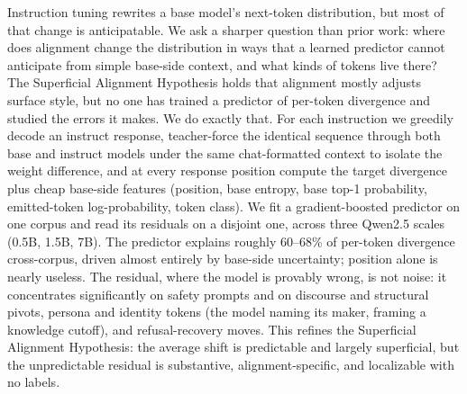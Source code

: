 Instruction tuning rewrites a base model's next-token distribution, but most of that change is anticipatable. We ask a sharper question than prior work: where does alignment change the distribution in ways that a learned predictor cannot anticipate from simple base-side context, and what kinds of tokens live there? The Superficial Alignment Hypothesis holds that alignment mostly adjusts surface style, but no one has trained a predictor of per-token divergence and studied the errors it makes. We do exactly that. For each instruction we greedily decode an instruct response, teacher-force the identical sequence through both base and instruct models under the same chat-formatted context to isolate the weight difference, and at every response position compute the target divergence plus cheap base-side features (position, base entropy, base top-1 probability, emitted-token log-probability, token class). We fit a gradient-boosted predictor on one corpus and read its residuals on a disjoint one, across three Qwen2.5 scales (0.5B, 1.5B, 7B). The predictor explains roughly 60--68\% of per-token divergence cross-corpus, driven almost entirely by base-side uncertainty; position alone is nearly useless. The residual, where the model is provably wrong, is not noise: it concentrates significantly on safety prompts and on discourse and structural pivots, persona and identity tokens (the model naming its maker, framing a knowledge cutoff), and refusal-recovery moves. This refines the Superficial Alignment Hypothesis: the average shift is predictable and largely superficial, but the unpredictable residual is substantive, alignment-specific, and localizable with no labels.
